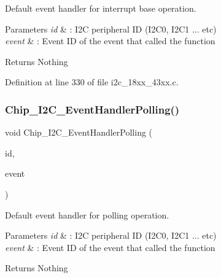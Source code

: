 Default event handler for interrupt base operation. 


\begin{DoxyParams}{Parameters}
{\em id} & \+: I2C peripheral ID (I2\+C0, I2\+C1 ... etc) \\
\hline
{\em event} & \+: Event ID of the event that called the function \\
\hline
\end{DoxyParams}
\begin{DoxyReturn}{Returns}
Nothing 
\end{DoxyReturn}


Definition at line 330 of file i2c\+\_\+18xx\+\_\+43xx.\+c.

\mbox{\label{group___i2_c__18_x_x__43_x_x_gaaa89a66d658a41325b3c5e56bc059401}} 
\subsubsection{\texorpdfstring{Chip\+\_\+\+I2\+C\+\_\+\+Event\+Handler\+Polling()}{Chip\_I2C\_EventHandlerPolling()}}
{\footnotesize\ttfamily void Chip\+\_\+\+I2\+C\+\_\+\+Event\+Handler\+Polling (\begin{DoxyParamCaption}\item[{\hyperlink{group___i2_c__18_x_x__43_x_x_ga957556a4d900506cd4cba8427afd81e6}{I2\+C\+\_\+\+I\+D\+\_\+T}}]{id,  }\item[{\hyperlink{group___i2_c__18_x_x__43_x_x_gacb2cd4e03ea48339d327e4f387441bf3}{I2\+C\+\_\+\+E\+V\+E\+N\+T\+\_\+T}}]{event }\end{DoxyParamCaption})}



Default event handler for polling operation. 


\begin{DoxyParams}{Parameters}
{\em id} & \+: I2C peripheral ID (I2\+C0, I2\+C1 ... etc) \\
\hline
{\em event} & \+: Event ID of the event that called the function \\
\hline
\end{DoxyParams}
\begin{DoxyReturn}{Returns}
Nothing 
\end{DoxyReturn}


